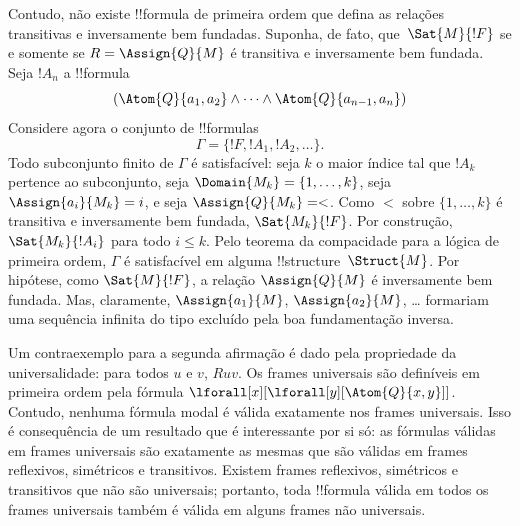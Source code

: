 \documentclass[../../../include/open-logic-section]{subfiles}
\begin{document}
Contudo, não existe !!{formula} de primeira ordem que defina as relações
transitivas e inversamente bem fundadas. Suponha, de fato, que~$\Sat{M}{!F}$
se e somente se $R = \Assign{Q}{M}$ é transitiva e inversamente bem fundada.
Seja $!A_n$ a !!{formula}
\[
(\Atom{Q}{a_1,a_2} \land \dots \land
    \Atom{Q}{a_{n-1},a_{n}})
\]
Considere agora o conjunto de !!{formula}s
\[
\Gamma = \{!F, !A_1, !A_2, \dots\}.
\]
Todo subconjunto finito de $\Gamma$ é satisfacível: seja $k$ o maior índice
tal que $!A_k$ pertence ao subconjunto, seja
$\Domain{M_k} = \{1, \dots, k\}$, seja $\Assign{a_i}{M_k} = i$, e seja
$\Assign{Q}{M_k} = <$. Como $<$ sobre $\{1, \dots, k\}$ é transitiva e
inversamente bem fundada, $\Sat{M_k}{!F}$. Por construção,
$\Sat{M_k}{!A_i}$ para todo $i \le k$. Pelo teorema da compacidade para a
lógica de primeira ordem, $\Gamma$ é satisfacível em alguma
!!{structure}~$\Struct{M}$. Por hipótese, como $\Sat{M}{!F}$, a relação
$\Assign{Q}{M}$ é inversamente bem fundada. Mas, claramente,
$\Assign{a_1}{M}$, $\Assign{a_2}{M}$, \dots{} formariam uma sequência
infinita do tipo excluído pela boa fundamentação inversa.

Um contraexemplo para a segunda afirmação é dado pela propriedade da
universalidade: para todos $u$ e $v$, $Ruv$. Os frames universais são
definíveis em primeira ordem pela fórmula
$\lforall[x][\lforall[y][\Atom{Q}{x,y}]]$. Contudo, nenhuma fórmula modal é
válida exatamente nos frames universais. Isso é consequência de um resultado
que é interessante por si só: as fórmulas válidas em frames universais são
exatamente as mesmas que são válidas em frames reflexivos, simétricos e
transitivos. Existem frames reflexivos, simétricos e transitivos que não são
universais; portanto, toda !!{formula} válida em todos os frames universais
também é válida em alguns frames não universais.
\end{document}
